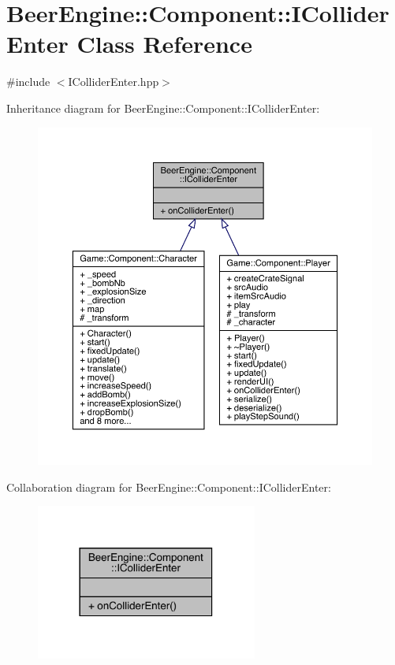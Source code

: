 \hypertarget{class_beer_engine_1_1_component_1_1_i_collider_enter}{}\section{Beer\+Engine\+:\+:Component\+:\+:I\+Collider\+Enter Class Reference}
\label{class_beer_engine_1_1_component_1_1_i_collider_enter}


{\ttfamily \#include $<$I\+Collider\+Enter.\+hpp$>$}



Inheritance diagram for Beer\+Engine\+:\+:Component\+:\+:I\+Collider\+Enter\+:\nopagebreak
\begin{figure}[H]
\begin{center}
\leavevmode
\includegraphics[width=350pt]{class_beer_engine_1_1_component_1_1_i_collider_enter__inherit__graph}
\end{center}
\end{figure}


Collaboration diagram for Beer\+Engine\+:\+:Component\+:\+:I\+Collider\+Enter\+:\nopagebreak
\begin{figure}[H]
\begin{center}
\leavevmode
\includegraphics[width=206pt]{class_beer_engine_1_1_component_1_1_i_collider_enter__coll__graph}
\end{center}
\end{figure}
